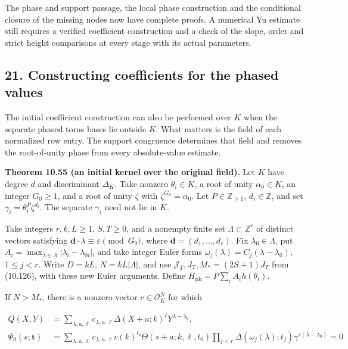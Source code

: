 \documentclass[
  11pt,
  a4paper,
]{article}
\newcounter{none} %
\begin{document}
The phase and support passage, the local phase construction and the
conditional closure of the missing nodes now have complete proofs. A
numerical Yu estimate still requires a verified coefficient construction
and a check of the slope, order and strict height comparisons at every
stage with its actual parameters.

\subsection{21. Constructing coefficients for the phased
values}\label{constructing-coefficients-for-the-phased-values}

The initial coefficient construction can also be performed over \(K\)
when the separate phased torus bases lie outside \(K\). What matters is
the field of each normalized row entry. The support congruence
determines that field and removes the root-of-unity phase from every
absolute-value estimate.

\textbf{Theorem 10.55 (an initial kernel over the original field).} Let
\(K\) have degree \(d\) and discriminant \(\Delta_K\). Take nonzero
\(\theta_i\in K\), a root of unity \(\alpha_0\in K\), an integer
\(G_0\ge1\), and a root of unity \(\zeta\) with
\(\zeta^{G_0}=\alpha_0\). Let \(P\in\mathbb Z_{\ge1}\),
\(d_i\in\mathbb Z\), and set \(\gamma_i=\theta_i^P\zeta^{d_i}\). The
separate \(\gamma_i\) need not lie in \(K\).

Take integers \(r,k,L\ge1\), \(S,T\ge0\), and a nonempty finite set
\(\Lambda\subset\mathbb Z^r\) of distinct vectors satisfying
\(\boldsymbol d\cdot\lambda\equiv\varepsilon\pmod{G_0}\), where
\(\boldsymbol d=(d_1,\ldots,d_r)\). Fix \(\lambda_0\in\Lambda\), put
\(A_i=\max_{\lambda\in\Lambda}|\lambda_i-\lambda_{0i}|\), and take
integer Euler forms \(\omega_j(\lambda)=C_j(\lambda-\lambda_0)\),
\(1\le j<r\). Write \(D=kL\), \(N=kL|\Lambda|\), and use
\(\mathcal J_T,J_T,M_*=(2S+1)J_T\) from (10.126), with these new Euler
arguments. Define \(H_{\mathrm{ph}}=P\sum_iA_i h(\theta_i)\).

If \(N>M_*\), there is a nonzero vector \(c\in\mathcal O_K^N\) for which

\[
\begin{aligned}
Q(X,Y)&=\sum_{\lambda,a,\ell}c_{\lambda,a,\ell}
\Delta(X+a;k)^\ell Y^{\lambda-\lambda_0},\\
\Psi_0(s;\boldsymbol t)&=\sum_{\lambda,a,\ell}c_{\lambda,a,\ell}
v(k)^{t_0}\Theta(s+a;k,\ell,t_0)
\prod_{j<r}\Delta(\omega_j(\lambda);t_j)
\gamma^{s(\lambda-\lambda_0)}
=0
\end{aligned}
\tag{10.150}
\]
\end{document}

